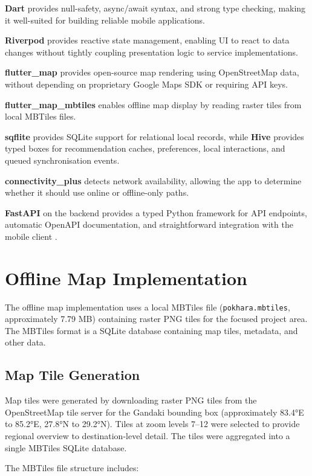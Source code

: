 \documentclass[12pt,a4paper,oneside]{report}
\begin{document}
\textbf{Dart} provides null-safety, async/await syntax, and strong type checking, making it well-suited for building reliable mobile applications.

\textbf{Riverpod} provides reactive state management, enabling UI to react to data changes without tightly coupling presentation logic to service implementations.

\textbf{flutter\_map} provides open-source map rendering using OpenStreetMap data, without depending on proprietary Google Maps SDK or requiring API keys.

\textbf{flutter\_map\_mbtiles} enables offline map display by reading raster tiles from local MBTiles files.

\textbf{sqflite} provides SQLite support for relational local records, while \textbf{Hive} provides typed boxes for recommendation caches, preferences, local interactions, and queued synchronisation events.

\textbf{connectivity\_plus} detects network availability, allowing the app to determine whether it should use online or offline-only paths.

\textbf{FastAPI} on the backend provides a typed Python framework for API endpoints, automatic OpenAPI documentation, and straightforward integration with the mobile client \parencite{FastAPI2026}.

\section{Offline Map Implementation}
\label{sec:map_impl}

The offline map implementation uses a local MBTiles file (\texttt{pokhara.mbtiles}, approximately 7.79 MB) containing raster PNG tiles for the focused project area. The MBTiles format is a SQLite database containing map tiles, metadata, and other data.

\subsection{Map Tile Generation}

Map tiles were generated by downloading raster PNG tiles from the OpenStreetMap tile server for the Gandaki bounding box (approximately 83.4°E to 85.2°E, 27.8°N to 29.2°N). Tiles at zoom levels 7--12 were selected to provide regional overview to destination-level detail. The tiles were aggregated into a single MBTiles SQLite database.

The MBTiles file structure includes:
\end{document}
